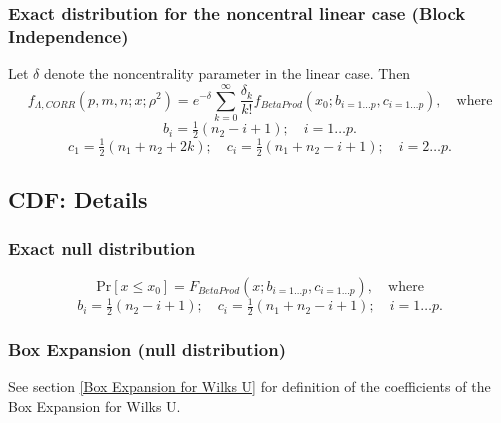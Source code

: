 \subsubsection{Exact distribution for the noncentral linear case (Block Independence)}
Let $\delta$ denote the noncentrality parameter in the linear case. Then
\begin{equation}
	f_{\Lambda,CORR}(p,m,n;x;\rho^2) = e^{-\delta} \sum_{k=0}^{\infty} \frac{\delta_k}{k!} f_{BetaProd}(x_0; b_{i=1\ldots p},c_{i=1\ldots p}), \quad \text{where}
\end{equation}
\begin{equation}
	b_i = \tfrac{1}{2} (n_2 -i+1); \quad i=1 \ldots p.
\end{equation}
\begin{equation}
	c_1 = \tfrac{1}{2} (n_1 + n_2 +2k); \quad c_i = \tfrac{1}{2} (n_1 + n_2 -i+1); \quad i=2 \ldots p.
\end{equation}




\subsection{CDF: Details}

\subsubsection{Exact null distribution}
\label{WilksLambdaDistributionDistributionCDF}

\begin{equation}
	\text{Pr}[x \leq x_0] = F_{BetaProd}(x; b_{i=1\ldots p},c_{i=1\ldots p}), \quad \text{where}
\end{equation}
\begin{equation}
	b_i = \tfrac{1}{2} (n_2 -i+1); \quad c_i = \tfrac{1}{2} (n_1 + n_2 -i+1); \quad i=1 \ldots p.
\end{equation}


\subsubsection{Box Expansion (null distribution)}
See section \ref{Box Expansion for Wilks U} for definition of the coefficients of the Box Expansion for Wilks U.





